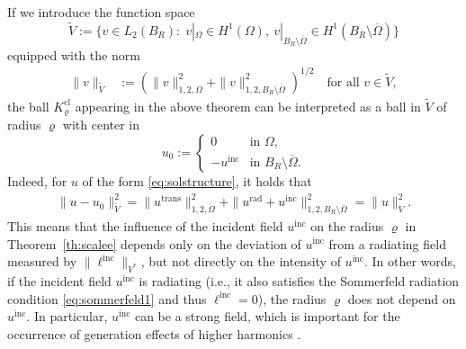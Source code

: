 \documentclass[12pt,DIV=14]{scrartcl}
\providecommand{\Om}{\Omega}
\begin{document}
If we introduce the function space
\[
\tilde{V} := \{v\in L_2(B_R):\; v|_\Om\in H^1(\Om),\ v|_{B_R\setminus\overline\Om}\in H^1(B_R\setminus\overline\Om)\}
\]
equipped with the norm
\begin{align*}
\|v\|_{\tilde{V}}
& := \left(\|v\|_{1,2,\Om}^2 + \|v\|_{1,2,B_R\setminus\overline\Om}^2\right)^{1/2}
\quad
\text{for all }
v \in \tilde{V},
\end{align*}
the ball $K_\varrho^\mathrm{cl}$ appearing in the above theorem
can be interpreted as a ball in $\tilde{V}$ of radius $\varrho$ with center in
\[
u_0 := \begin{cases}
0 & \text{in } \Om,\\
-u^\mathrm{inc} & \text{in } B_R\setminus\overline\Om.
\end{cases}
\]
Indeed, for $u$ of the form \eqref{eq:solstructure}, it holds that
\begin{align*}
\|u-u_0\|_{\tilde{V}}^2
= \|u^\mathrm{trans}\|_{1,2,\Om}^2
+ \|u^\mathrm{rad}+u^\mathrm{inc}\|_{1,2,B_R\setminus\overline\Om}^2
= \|u\|_V^2.
\end{align*}
This means that the influence of the incident field $u^\mathrm{inc}$ on the radius $\varrho$
in Theorem~\ref{th:scalee} depends only on the deviation of $u^\mathrm{inc}$
from a radiating field measured by $\|\ell^\mathrm{inc}\|_{V^\ast}$,
but not directly on the intensity of $u^\mathrm{inc}$.
In other words, if the incident field $u^\mathrm{inc}$ is radiating
(i.e., it also satisfies the Sommerfeld radiation condition \eqref{eq:sommerfeld1}
and thus $\ell^\mathrm{inc}=0$),
the radius $\varrho$ does not depend on $u^\mathrm{inc}$.
In particular, $u^\mathrm{inc}$ can be a strong field, which is important
for the occurrence of generation effects of higher harmonics \cite{Angermann:19a}.
\end{document}

